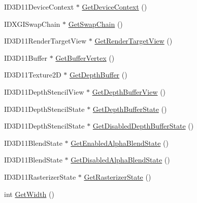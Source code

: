 \begin{DoxyCompactItemize}
\item 
I\-D3\-D11\-Device\-Context $\ast$ \hyperlink{class_osiris_i_1_1_graphics_1_1_devices_1_1_direct3_d_device_ad2d0124e7bde9b917e6d1a7ea491f07a}{Get\-Device\-Context} ()
\item 
I\-D\-X\-G\-I\-Swap\-Chain $\ast$ \hyperlink{class_osiris_i_1_1_graphics_1_1_devices_1_1_direct3_d_device_a89e9fb45017c0663b149deee014bbf48}{Get\-Swap\-Chain} ()
\item 
I\-D3\-D11\-Render\-Target\-View $\ast$ \hyperlink{class_osiris_i_1_1_graphics_1_1_devices_1_1_direct3_d_device_a6cbd5cb5433186e78253368d21d68523}{Get\-Render\-Target\-View} ()
\item 
I\-D3\-D11\-Buffer $\ast$ \hyperlink{class_osiris_i_1_1_graphics_1_1_devices_1_1_direct3_d_device_a05d305ed6b11317a0136b1ff0487d53e}{Get\-Buffer\-Vertex} ()
\item 
I\-D3\-D11\-Texture2\-D $\ast$ \hyperlink{class_osiris_i_1_1_graphics_1_1_devices_1_1_direct3_d_device_ae6ebd537599f1e1722f74eba38992192}{Get\-Depth\-Buffer} ()
\item 
I\-D3\-D11\-Depth\-Stencil\-View $\ast$ \hyperlink{class_osiris_i_1_1_graphics_1_1_devices_1_1_direct3_d_device_ab61ab24c809a8acebb9b391a7396324f}{Get\-Depth\-Buffer\-View} ()
\item 
I\-D3\-D11\-Depth\-Stencil\-State $\ast$ \hyperlink{class_osiris_i_1_1_graphics_1_1_devices_1_1_direct3_d_device_aedf1b7df19e2a43e064ff412b586918c}{Get\-Depth\-Buffer\-State} ()
\item 
I\-D3\-D11\-Depth\-Stencil\-State $\ast$ \hyperlink{class_osiris_i_1_1_graphics_1_1_devices_1_1_direct3_d_device_a82eb59a21868dbff0ce93594d7c037e4}{Get\-Disabled\-Depth\-Buffer\-State} ()
\item 
I\-D3\-D11\-Blend\-State $\ast$ \hyperlink{class_osiris_i_1_1_graphics_1_1_devices_1_1_direct3_d_device_a4353c7e8921374424d00fcb0a71ed94d}{Get\-Enabled\-Alpha\-Blend\-State} ()
\item 
I\-D3\-D11\-Blend\-State $\ast$ \hyperlink{class_osiris_i_1_1_graphics_1_1_devices_1_1_direct3_d_device_a275b5e6485470256692e7917affcf01c}{Get\-Disabled\-Alpha\-Blend\-State} ()
\item 
I\-D3\-D11\-Rasterizer\-State $\ast$ \hyperlink{class_osiris_i_1_1_graphics_1_1_devices_1_1_direct3_d_device_a3fcc1a5ec6f54202854cf4dfe36e13d7}{Get\-Rasterizer\-State} ()
\item 
int \hyperlink{class_osiris_i_1_1_graphics_1_1_devices_1_1_direct3_d_device_a4330819274d5d94d4dd5867fe7c0e295}{Get\-Width} ()
\item 

\end{DoxyCompactItemize}

